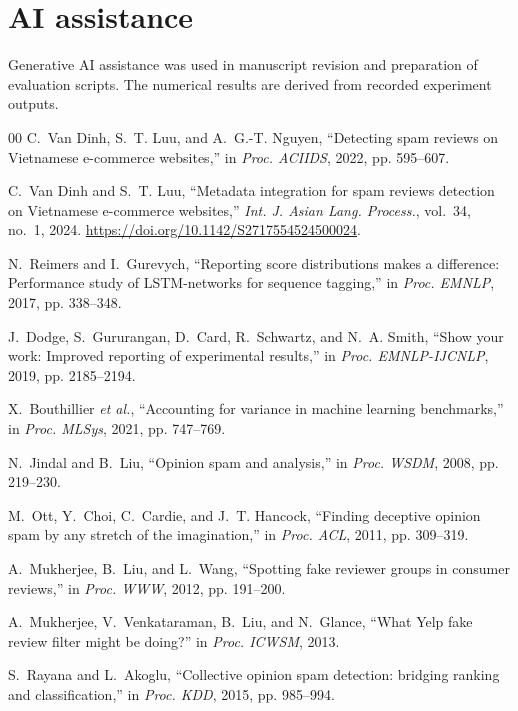 \documentclass[12pt,a4paper]{article}
\begin{document}
\section*{AI assistance}
Generative AI assistance was used in manuscript revision and preparation of evaluation scripts. The numerical results are derived from recorded experiment outputs.

\begin{thebibliography}{00}
\setlength{\itemsep}{0pt}
C.~Van Dinh, S.~T. Luu, and A.~G.-T. Nguyen, ``Detecting spam reviews on Vietnamese e-commerce websites,'' in \emph{Proc. ACIIDS}, 2022, pp. 595--607.

C.~Van Dinh and S.~T. Luu, ``Metadata integration for spam reviews detection on Vietnamese e-commerce websites,'' \emph{Int. J. Asian Lang. Process.}, vol.~34, no.~1, 2024. \url{https://doi.org/10.1142/S2717554524500024}.

N.~Reimers and I.~Gurevych, ``Reporting score distributions makes a difference: Performance study of LSTM-networks for sequence tagging,'' in \emph{Proc. EMNLP}, 2017, pp. 338--348.

J.~Dodge, S.~Gururangan, D.~Card, R.~Schwartz, and N.~A. Smith, ``Show your work: Improved reporting of experimental results,'' in \emph{Proc. EMNLP-IJCNLP}, 2019, pp. 2185--2194.

X.~Bouthillier \emph{et al.}, ``Accounting for variance in machine learning benchmarks,'' in \emph{Proc. MLSys}, 2021, pp. 747--769.

N.~Jindal and B.~Liu, ``Opinion spam and analysis,'' in \emph{Proc. WSDM}, 2008, pp. 219--230.

M.~Ott, Y.~Choi, C.~Cardie, and J.~T. Hancock, ``Finding deceptive opinion spam by any stretch of the imagination,'' in \emph{Proc. ACL}, 2011, pp. 309--319.

A.~Mukherjee, B.~Liu, and L.~Wang, ``Spotting fake reviewer groups in consumer reviews,'' in \emph{Proc. WWW}, 2012, pp. 191--200.

A.~Mukherjee, V.~Venkataraman, B.~Liu, and N.~Glance, ``What Yelp fake review filter might be doing?'' in \emph{Proc. ICWSM}, 2013.

S.~Rayana and L.~Akoglu, ``Collective opinion spam detection: bridging ranking and classification,'' in \emph{Proc. KDD}, 2015, pp. 985--994.


\end{thebibliography}
\end{document}
